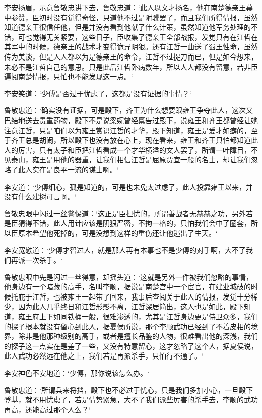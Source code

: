 李安扬眉，示意鲁敬忠讲下去，鲁敬忠道：‘此人以文才扬名，他在南楚德亲王幕中参赞，臣初时没有觉得奇怪，只道他不过是附骥罢了，而且我们所得情报，虽然知道德亲王很信任他，但是并没有看到他献了什么计策，虽然知道他军务处理的不错，可也觉得无关紧要，这些日子，臣收集了德亲王全部战报，发觉只有在江哲在其军中的时候，德亲王的战术才变得诡异阴狠。还有江哲一曲送了蜀王性命，虽然传为美谈，但是人人都以为是德亲王的命令，江哲不过捉刀而已，但是如今想来，未必不是江哲自己的意思。只是此后江哲卧病数年，所以人人都没有留意，若非臣遍阅南楚情报，只怕也不能发现这一点。‘

李安笑道：‘少傅是否过于忧虑了，这都是没有证据的事情？‘

鲁敬忠道：‘确实没有证据，可是殿下，齐王为什么想要跟雍王争夺此人，这次又巴结地送去贵重药物，殿下不是说梁婉曾经禀告过殿下，说雍王和齐王都曾经让她注意江哲，只是咱们以为雍王赏识江哲的才华，殿下知道，雍王是爱才如癖的，至于齐王总是胡闹，所以殿下也没有放在心上，现在看来，雍王和齐王只怕都知道此人的厉害，只有太子和臣把江哲看成一个才华横溢的文人罢了，所谓一叶障目，不见泰山，雍王是用他的器重，让我们相信江哲是屈原贾宜一般的名士，却让我们忽略了此人实在是良平一流的谋士啊。‘

李安道：‘少傅细心，孤是知道的，可是也未免太过虑了，此人投靠雍王以来，并没有什么建树可言啊。‘

鲁敬忠眼中闪过一丝警惕道：‘这正是臣担忧的，所谓善战者无赫赫之功，另外若是臣猜得不错，此人用计应该是阴狠严密，不拘一格的，只怕我们会中了圈套，所以臣原本希望他死掉的，可是没想到这样的重伤还让他逃出了生天。‘

李安宽慰道：‘少傅才智过人，就是那人再有本事也不是少傅的对手啊，大不了我们再派一次杀手。‘

鲁敬忠眼中先是闪过一丝得意，却摇头道：‘这就是另外一件被我们忽略的事情，他身边有一个暗藏的高手，名叫李顺，据说是南楚宫中一个宦官，在建业城破的时候托庇于江哲，也被雍王一起带了回来，我事后查阅关于此人的情报，发觉十分稀少，因为此人几乎终日和江哲形影不离，江哲深居简出，这人也是如此，殿下知道，雍王府上下如同铁桶一般，很难渗透的，尤其是江哲身边更是侍卫众多，我们的探子根本就没有留心到此人，据夏侯所说，那个李顺武功已经到了不着皮相的境界，除非是他那种级别的高手，或者是擅长品鉴的人物，很难看出他的深浅，我们的探子这一点实在是差了一些，又没有特意留心，这才忽略了这个人，据夏侯说，此人武功必然远在他之上，我们若是再派杀手，只怕行不通了。‘

李安神色不安地道：‘少傅，那你说该怎么办。‘

鲁敬忠道：‘所谓兵来将挡，殿下也不必过于忧心，只是我们多加小心，一旦殿下登基，就不用忧虑了，若是情势紧急，大不了我们派些厉害的杀手去，李顺的武功再高，还能高过那个人么？‘

